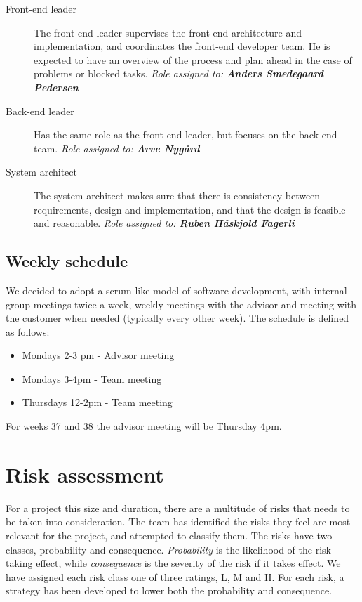 \documentclass[11pt,a4paper,titlepage,oneside]{report}
\begin{document}
\begin{description}
\item[Front-end leader] The front-end leader supervises the front-end architecture and implementation, and coordinates the front-end developer team. He is expected to have an overview of the process and plan ahead in the case of problems or blocked tasks.
\emph{Role assigned to: \textbf{Anders Smedegaard Pedersen}}

\item[Back-end leader] Has the same role as the front-end leader, but focuses on the back end team.
\emph{Role assigned to: \textbf{Arve Nygård}}

\item[System architect] The system architect makes sure that there is consistency between requirements, design and implementation, and that the design is feasible and reasonable.
\emph{Role assigned to: \textbf{Ruben Håskjold Fagerli}}
\end{description}

\subsection{Weekly schedule}
We decided to adopt a scrum-like model of software development, with internal group meetings twice a week, weekly meetings with the advisor and meeting with the customer when needed (typically every other week). The schedule is defined as follows:
\begin{itemize}
\item Mondays 2-3 pm - Advisor meeting
\item Mondays 3-4pm - Team meeting
\item Thursdays 12-2pm - Team meeting
\end{itemize}
For weeks 37 and 38 the advisor meeting will be Thursday 4pm.

\section{Risk assessment}
For a project this size and duration, there are a multitude of risks that needs to be taken into consideration. The team has identified the risks they feel are most relevant for the project, and attempted to classify them. The risks have two classes, probability and consequence. \textit{Probability} is the likelihood of the risk taking effect, while \textit{consequence} is the severity of the risk if it takes effect. We have assigned each risk class one of three ratings, \gls{L}, \gls{M} and \gls{H}. For each risk, a strategy has been developed to lower both the probability and consequence. 
\end{document}
